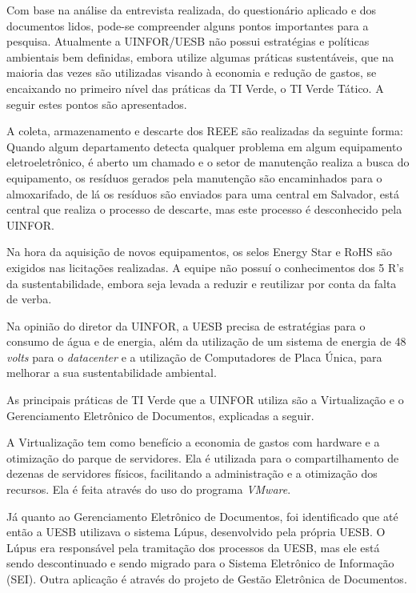 Com base na análise da entrevista realizada, do questionário aplicado e dos documentos lidos, pode-se compreender alguns pontos importantes para a pesquisa. Atualmente a UINFOR/UESB não possui estratégias e políticas ambientais bem definidas, embora utilize algumas práticas sustentáveis, que na maioria das vezes são utilizadas visando à economia e redução de gastos, se encaixando no primeiro nível das práticas da TI Verde, o TI Verde Tático. A seguir estes pontos são apresentados. 

A coleta, armazenamento e descarte dos REEE são realizadas da seguinte forma: Quando algum departamento detecta qualquer problema em algum equipamento eletroeletrônico, é aberto um chamado e o setor de manutenção realiza a busca do equipamento, os resíduos gerados pela manutenção são encaminhados para o almoxarifado, de lá os resíduos são enviados para uma central em Salvador, está central que realiza o processo de descarte, mas este processo é desconhecido pela UINFOR.

Na hora da aquisição de novos equipamentos, os selos Energy Star e RoHS são exigidos nas licitações realizadas. A equipe não possuí o conhecimentos dos 5 R's da sustentabilidade, embora seja levada a reduzir e reutilizar por conta da falta de verba.

Na opinião do diretor da UINFOR, a UESB precisa de estratégias para o consumo de água e de energia, além da utilização de um sistema de energia de 48 \textit{volts} para o \textit{datacenter} e a utilização de Computadores de Placa Única, para melhorar a sua sustentabilidade ambiental.

As principais práticas de TI Verde que a UINFOR utiliza são a Virtualização e o Gerenciamento Eletrônico de Documentos, explicadas a seguir.

A Virtualização tem como benefício a economia de gastos com hardware e a otimização do parque de servidores. Ela é utilizada para o compartilhamento de dezenas de servidores físicos, facilitando a administração e a otimização dos recursos. Ela é feita através do uso do programa \textit{VMware}. 

Já quanto ao Gerenciamento Eletrônico de Documentos, foi identificado que até então a UESB utilizava o sistema Lúpus, desenvolvido pela própria UESB. O Lúpus era responsável pela tramitação dos processos da UESB, mas ele está sendo descontinuado e sendo migrado para o Sistema Eletrônico de Informação (SEI). Outra aplicação é através do projeto de Gestão Eletrônica de Documentos.

